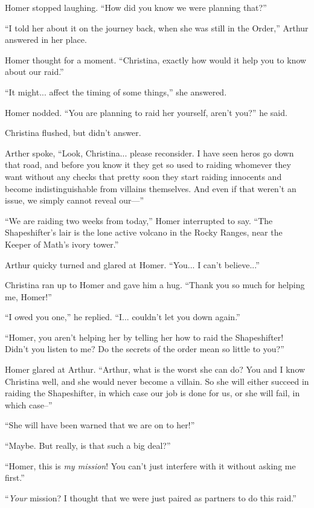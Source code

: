 \documentclass[showtrims,b6paper,draft,10pt]{memoir}
\begin{document}
Homer stopped laughing.  ``How did you know we were planning that?''

``I told her about it on the journey back, when she was still in the Order,'' Arthur answered in her place.

Homer thought for a moment.  ``Christina, exactly how would it help you to know about our raid.''

``It might... affect the timing of some things,'' she answered.

Homer nodded.  ``You are planning to raid her yourself, aren't you?'' he said.

Christina flushed, but didn't answer.

Arther spoke, ``Look, Christina... please reconsider.  I have seen heros go down that road, and before you know it they get so used to raiding whomever they want without any checks that pretty soon they start raiding innocents and become indistinguishable from villains themselves.  And even if that weren't an issue, we simply cannot reveal our---''

``We are raiding two weeks from today,'' Homer interrupted to say.  ``The Shapeshifter's lair is the lone active volcano in the Rocky Ranges, near the Keeper of Math's ivory tower.''

Arthur quicky turned and glared at Homer.  ``You... I can't believe...''

Christina ran up to Homer and gave him a hug.  ``Thank you so much for helping me, Homer!''

``I owed you one,'' he replied.  ``I... couldn't let you down again.''

``Homer, you aren't helping her by telling her how to raid the Shapeshifter!  Didn't you listen to me?  Do the secrets of the order mean so little to you?''

Homer glared at Arthur.  ``Arthur, what is the worst she can do?  You and I know Christina well, and she would never become a villain.  So she will either succeed in raiding the Shapeshifter, in which case our job is done for us, or she will fail, in which case--''

``She will have been warned that we are on to her!''

``Maybe.  But really, is that such a big deal?''

``Homer, this is \emph{my mission}!  You can't just interfere with it without asking me first.''

``\emph{Your} mission?  I thought that we were just paired as partners to do this raid.''
\end{document}
